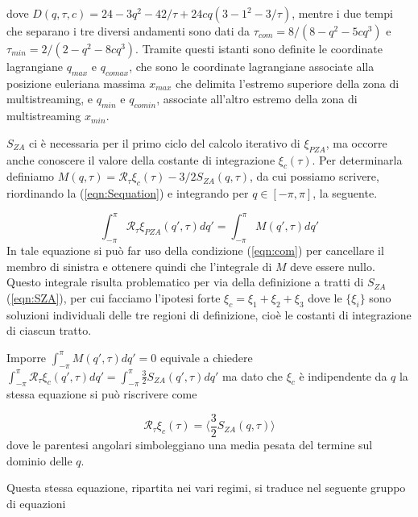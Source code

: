 dove $D(q, \tau, c) = 24 - 3q^2 -42/\tau + 24cq(3-1^2-3/\tau)$, mentre i due tempi che separano 
i tre diversi andamenti sono dati da $\tau_{com} = 8/(8-q^2-5cq^3)$ e $\tau_{min} = 2/(2-q^2-8cq^3)$.
Tramite questi istanti sono definite le coordinate lagrangiane $q_{max}$ e $q_{comax}$, che sono le 
coordinate lagrangiane associate alla posizione euleriana massima $x_{max}$ che delimita l'estremo
superiore della zona di multistreaming, e $q_{min}$ e $q_{comin}$, associate all'altro estremo 
della zona di multistreaming $x_{min}$. 

$S_{ZA}$ ci è necessaria per il primo ciclo del calcolo iterativo di $\xi_{PZA}$, ma occorre anche
conoscere il valore della costante di integrazione $\xi_c(\tau)$. Per determinarla definiamo 
$M(q, \tau) = \mathcal{R}_{\tau} \xi_c (\tau)- 3/2 S_{ZA}(q,\tau)$, da cui possiamo scrivere, 
riordinando la (\ref{eqn:Sequation}) e integrando per $q \in [-\pi, \pi]$, la seguente.

\begin{equation}
    \int_{-\pi}^{\pi} \mathcal{R}_{\tau}\xi_{PZA}(q', \tau)dq' = \int_{-\pi}^{\pi} M(q', \tau) dq'
\end{equation}
In tale equazione si può far uso della condizione (\ref{eqn:com}) per cancellare il membro di sinistra
e ottenere quindi che l'integrale di $M$ deve essere nullo. Questo integrale risulta problematico
per via della definizione a tratti di $S_{ZA}$ (\ref{eqn:SZA}), per cui facciamo l'ipotesi forte 
$\xi_c = \xi_1 + \xi_2 + \xi_3$ dove le $\{\xi_i\}$ sono soluzioni individuali delle tre regioni 
di definizione, cioè le costanti di integrazione di ciascun tratto.

Imporre $\int_{-\pi}^{\pi} M(q', \tau) dq' = 0$ equivale a chiedere 
$\int_{-\pi}^{\pi} \mathcal{R}_{\tau}\xi_c(q', \tau) dq' = \int_{-\pi}^{\pi} \frac{3}{2} S_{ZA}(q', \tau) dq'$
ma dato che $\xi_c$ è indipendente da $q$ la stessa equazione si può riscrivere come

\begin{equation}
    \mathcal{R}_{\tau} \xi_c(\tau) = \Big\langle \frac{3}{2}S_{ZA}(q, \tau) \Big\rangle
\end{equation}
dove le parentesi angolari simboleggiano una media pesata del termine sul dominio delle $q$.

Questa stessa equazione, ripartita nei vari regimi, si traduce nel seguente gruppo di equazioni


